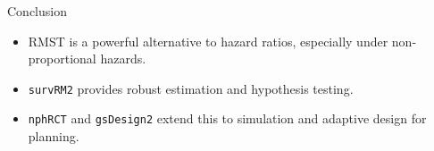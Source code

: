 \documentclass{beamer}
\begin{document}
\begin{frame}{Conclusion}
\begin{itemize}
    \item RMST is a powerful alternative to hazard ratios, especially under non-proportional hazards.
    \item \texttt{survRM2} provides robust estimation and hypothesis testing.
    \item \texttt{nphRCT} and \texttt{gsDesign2} extend this to simulation and adaptive design for planning.
\end{itemize}
\end{frame}
\end{document}
